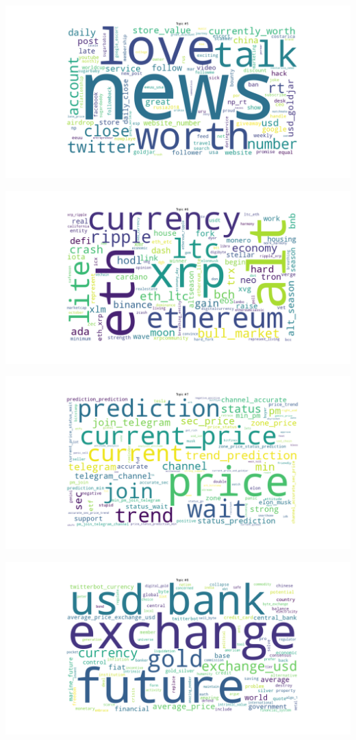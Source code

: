 \documentclass[
]{article}
\begin{document}
\pagebreak

\includegraphics{images/03 - Topic_5.png}

\pagebreak

\includegraphics{images/03 - Topic_6.png}

\pagebreak

\includegraphics{images/03 - Topic_7.png}

\pagebreak

\includegraphics{images/03 - Topic_8.png}
\end{document}
